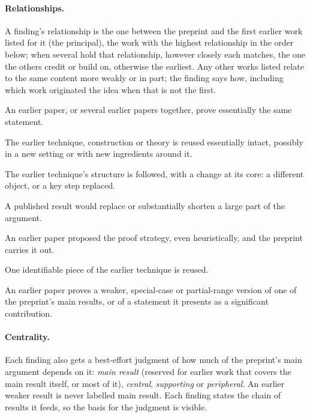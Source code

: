 \documentclass[11pt]{article}
\newcounter{finding}
\begin{document}
\paragraph{Relationships.}
A finding's relationship is the one between the preprint and the first
earlier work listed for it (the principal), the work with the highest relationship in the
order below; when several hold that relationship, however closely each matches,
the one the others credit or build on, otherwise the earliest. Any other works listed relate to the same content more weakly or
in part; the finding says how, including which work originated the idea when
that is not the first.
\begin{description}[leftmargin=1.5em,font=\normalfont\itshape]
\item[same result.] An earlier paper, or several earlier papers together, prove essentially the same statement.
\item[same technique.] The earlier technique, construction or theory is
reused essentially intact, possibly in a new setting or with new ingredients
around it.
\item[adapted.] The earlier technique's structure is followed, with a change
at its core: a different object, or a key step replaced.
\item[proof shortcut.] A published result would replace or substantially
shorten a large part of the argument.
\item[same route.] An earlier paper proposed the proof strategy, even
heuristically, and the preprint carries it out.
\item[fragment.] One identifiable piece of the earlier technique is reused.
\item[weaker result.] An earlier paper proves a weaker, special-case or
partial-range version of one of the preprint's main results, or of a
statement it presents as a significant contribution.
\end{description}

\paragraph{Centrality.}
Each finding also gets a best-effort judgment of how much of the preprint's
main argument depends on it: \emph{main result} (reserved for earlier work that
covers the main result itself, or most of it), \emph{central},
\emph{supporting} or \emph{peripheral}. An earlier weaker result is never
labelled main result. Each finding states the chain of results it feeds, so
the basis for the judgment is visible.
\end{document}
